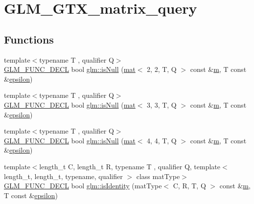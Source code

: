 \hypertarget{group__gtx__matrix__query}{}\section{G\+L\+M\+\_\+\+G\+T\+X\+\_\+matrix\+\_\+query}
\label{group__gtx__matrix__query}
\subsection*{Functions}
\begin{DoxyCompactItemize}
\item 
{\footnotesize template$<$typename T , qualifier Q$>$ }\\\hyperlink{setup_8hpp_ab2d052de21a70539923e9bcbf6e83a51}{G\+L\+M\+\_\+\+F\+U\+N\+C\+\_\+\+D\+E\+CL} bool \hyperlink{group__gtx__matrix__query_ga9790ec222ce948c0ff0d8ce927340dba}{glm\+::is\+Null} (\hyperlink{structglm_1_1mat}{mat}$<$ 2, 2, T, Q $>$ const \&\hyperlink{_s_d_l__opengl__glext_8h_af593500c283bf1a787a6f947f503a5c2}{m}, T const \&\hyperlink{group__gtc__constants_ga2a1e57fc5592b69cfae84174cbfc9429}{epsilon})
\item 
{\footnotesize template$<$typename T , qualifier Q$>$ }\\\hyperlink{setup_8hpp_ab2d052de21a70539923e9bcbf6e83a51}{G\+L\+M\+\_\+\+F\+U\+N\+C\+\_\+\+D\+E\+CL} bool \hyperlink{group__gtx__matrix__query_gae14501c6b14ccda6014cc5350080103d}{glm\+::is\+Null} (\hyperlink{structglm_1_1mat}{mat}$<$ 3, 3, T, Q $>$ const \&\hyperlink{_s_d_l__opengl__glext_8h_af593500c283bf1a787a6f947f503a5c2}{m}, T const \&\hyperlink{group__gtc__constants_ga2a1e57fc5592b69cfae84174cbfc9429}{epsilon})
\item 
{\footnotesize template$<$typename T , qualifier Q$>$ }\\\hyperlink{setup_8hpp_ab2d052de21a70539923e9bcbf6e83a51}{G\+L\+M\+\_\+\+F\+U\+N\+C\+\_\+\+D\+E\+CL} bool \hyperlink{group__gtx__matrix__query_ga2b98bb30a9fefa7cdea5f1dcddba677b}{glm\+::is\+Null} (\hyperlink{structglm_1_1mat}{mat}$<$ 4, 4, T, Q $>$ const \&\hyperlink{_s_d_l__opengl__glext_8h_af593500c283bf1a787a6f947f503a5c2}{m}, T const \&\hyperlink{group__gtc__constants_ga2a1e57fc5592b69cfae84174cbfc9429}{epsilon})
\item 
{\footnotesize template$<$length\+\_\+t C, length\+\_\+t R, typename T , qualifier Q, template$<$ length\+\_\+t, length\+\_\+t, typename, qualifier $>$ class mat\+Type$>$ }\\\hyperlink{setup_8hpp_ab2d052de21a70539923e9bcbf6e83a51}{G\+L\+M\+\_\+\+F\+U\+N\+C\+\_\+\+D\+E\+CL} bool \hyperlink{group__gtx__matrix__query_gaee935d145581c82e82b154ccfd78ad91}{glm\+::is\+Identity} (mat\+Type$<$ C, R, T, Q $>$ const \&\hyperlink{_s_d_l__opengl__glext_8h_af593500c283bf1a787a6f947f503a5c2}{m}, T const \&\hyperlink{group__gtc__constants_ga2a1e57fc5592b69cfae84174cbfc9429}{epsilon})

\end{DoxyCompactItemize}

